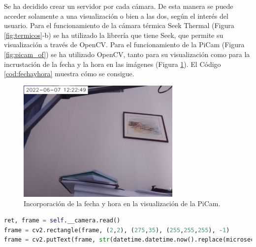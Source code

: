Se ha decidido crear un servidor por cada cámara. De esta manera se puede acceder solamente a una visualización o bien a las dos, según el interés del usuario. Para el funcionamiento de la cámara térmica Seek Thermal (Figura \ref{fig:termicos}-b) se ha utilizado la librería que tiene Seek, que permite su visualización a través de OpenCV. Para el funcionamiento de la PiCam (Figura \ref{fig:picam_of}) se ha utilizado OpenCV, tanto para su visualización como para la incrustación de la fecha y la hora en las imágenes (Figura \ref{fig:fechayhora}). El Código \ref{cod:fechayhora} muestra cómo se consigue.\\
\begin{figure} [h!]
  \begin{center}
    \includegraphics[width=8cm]{figs/fechayhora}
  \end{center}
  \caption{Incorporación de la fecha y hora en la visualización de la PiCam.}
  \label{fig:fechayhora}
\end{figure}

\begin{code}[h]
\begin{lstlisting}[language=Python]
ret, frame = self.__camera.read()
frame = cv2.rectangle(frame, (2,2), (275,35), (255,255,255), -1)
frame = cv2.putText(frame, str(datetime.datetime.now().replace(microsecond=0)), (10,25), cv2.FONT_HERSEY_SIMPLEX, 0.7, (0,0,0), 1, cv2.LINE_AA))
\end{lstlisting}
\caption[Código para incorporar la fecha en la esquina superior izquierda.]{Código para incorporar la fecha en la esquina superior izquierda.}
\label{cod:fechayhora}
\end{code}

